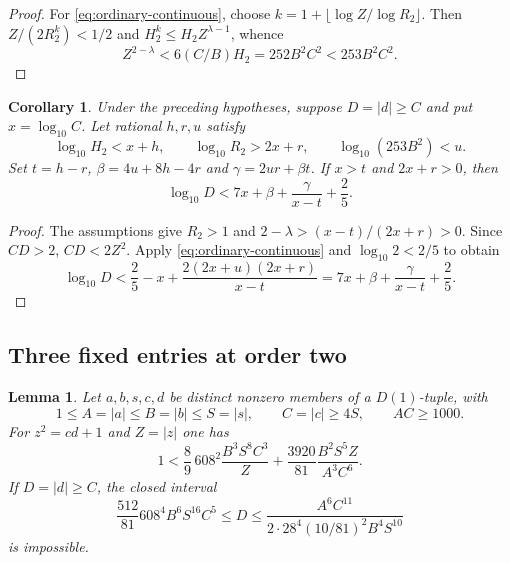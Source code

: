 \documentclass[12pt]{article}
\newtheorem{lemma}[theorem]{Lemma}
\newtheorem{corollary}[theorem]{Corollary}
\numberwithin{equation}{section}
\begin{document}
\begin{proof}
For \eqref{eq:ordinary-continuous}, choose
$k=1+\lfloor\log Z/\log R_2\rfloor$.  Then
$Z/(2R_2^k)<1/2$ and $H_2^k\le H_2Z^{\lambda-1}$, whence
\[
 Z^{2-\lambda}<6(C/B)H_2=252B^2C^2<253B^2C^2.
\]
\end{proof}

\begin{corollary}\label{cor:ordinary-height-envelope}
Under the preceding hypotheses, suppose $D=|d|\ge C$ and put
$x=\log_{10}C$.  Let rational $h,r,u$ satisfy
\[
 \log_{10}H_2<x+h,\qquad
 \log_{10}R_2>2x+r,\qquad
 \log_{10}(253B^2)<u.
\]
Set $t=h-r$, $\beta=4u+8h-4r$ and $\gamma=2ur+\beta t$.
If $x>t$ and $2x+r>0$, then
\[
 \log_{10}D<7x+\beta+\frac\gamma{x-t}+\frac25.
\]
\end{corollary}

\begin{proof}
The assumptions give $R_2>1$ and
$2-\lambda>(x-t)/(2x+r)>0$.  Since $CD>2$,
$CD<2Z^2$.  Apply \eqref{eq:ordinary-continuous} and
$\log_{10}2<2/5$ to obtain
\[
 \log_{10}D<\frac25-x+
       \frac{2(2x+u)(2x+r)}{x-t}
       =7x+\beta+\frac\gamma{x-t}+\frac25.
\]
\end{proof}

\subsection{Three fixed entries at order two}

\begin{lemma}\label{lem:ordinary-three-normalized}
Let $a,b,s,c,d$ be distinct nonzero members of a $D(1)$-tuple, with
\[
 1\le A=|a|\le B=|b|\le S=|s|,\qquad
 C=|c|\ge4S,\qquad AC\ge1000.
\]
For $z^2=cd+1$ and $Z=|z|$ one has
\begin{equation}\label{eq:ordinary-three-M}
 1<\frac89\,608^2\frac{B^3S^8C^3}{Z}
       +\frac{3920}{81}\frac{B^2S^5Z}{A^3C^6}.
\end{equation}
If $D=|d|\ge C$, the closed interval
\begin{equation}\label{eq:ordinary-three-coarse-window}
 \frac{512}{81}608^4B^6S^{16}C^5\le D\le
 \frac{A^6C^{11}}{2\cdot28^4(10/81)^2B^4S^{10}}
\end{equation}
is impossible.
\end{lemma}
\end{document}
